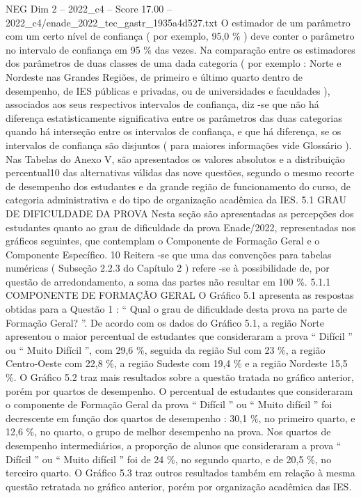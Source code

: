 \begin{textsample}{NEG Dim 2 – 2022\_c4 – Score 17.00 – 2022\_c4/enade\_2022\_tec\_gastr\_1935a4d527.txt}
O estimador de um parâmetro com um certo nível de confiança ( por exemplo, 95,0 \% ) deve conter o parâmetro no intervalo de confiança em 95 \% das vezes.
Na comparação entre os estimadores dos parâmetros de duas classes de uma dada categoria ( por exemplo : Norte e Nordeste nas Grandes Regiões, de primeiro e último quarto dentro de desempenho, de IES públicas e privadas, ou de universidades e faculdades ), associados aos seus respectivos intervalos de confiança, diz -se que não há diferença estatisticamente significativa entre os parâmetros das duas categorias quando há interseção entre os intervalos de confiança, e que há diferença, se os intervalos de confiança são disjuntos ( para maiores informações vide Glossário ).
Nas Tabelas do Anexo V, são apresentados os valores absolutos e a distribuição percentual10 das alternativas válidas das nove questões, segundo o mesmo recorte de desempenho dos estudantes e da grande região de funcionamento do curso, de categoria administrativa e do tipo de organização acadêmica da IES. 5.1 GRAU DE DIFICULDADE DA PROVA Nesta seção são apresentadas as percepções dos estudantes quanto ao grau de dificuldade da prova Enade/2022, representadas nos gráficos seguintes, que contemplam o Componente de Formação Geral e o Componente Específico. 10 Reitera -se que uma das convenções para tabelas numéricas ( Subseção 2.2.3 do Capítulo 2 ) refere -se à possibilidade de, por questão de arredondamento, a soma das partes não resultar em 100 \%. 5.1.1 COMPONENTE DE FORMAÇÃO GERAL O Gráfico 5.1 apresenta as respostas obtidas para a Questão 1 : “ Qual o grau de dificuldade desta prova na parte de Formação Geral? ”.
De acordo com os dados do Gráfico 5.1, a região Norte apresentou o maior percentual de estudantes que consideraram a prova “ Difícil ” ou “ Muito Difícil ”, com 29,6 \%, seguida da região Sul com 23 \%, a região Centro-Oeste com 22,8 \%, a região Sudeste com 19,4 \% e a região Nordeste 15,5 \%.
O Gráfico 5.2 traz mais resultados sobre a questão tratada no gráfico anterior, porém por quartos de desempenho.
O percentual de estudantes que consideraram o componente de Formação Geral da prova “ Difícil ” ou “ Muito difícil ” foi decrescente em função dos quartos de desempenho : 30,1 \%, no primeiro quarto, e 12,6 \%, no quarto, o grupo de melhor desempenho na prova.
Nos quartos de desempenho intermediários, a proporção de alunos que consideraram a prova “ Difícil ” ou “ Muito difícil ” foi de 24 \%, no segundo quarto, e de 20,5 \%, no terceiro quarto.
O Gráfico 5.3 traz outros resultados também em relação à mesma questão retratada no gráfico anterior, porém por organização acadêmica das IES.

\end{textsample}
